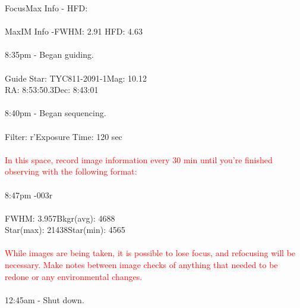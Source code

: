 \documentclass[11pt]{report}
\begin{document}
FocusMax Info - \hspace{72pt}HFD: \\ \\
MaxIM Info -\hspace{90pt}FWHM: 2.91 \hspace{75pt}HFD: 4.63 \\ \\
8:35pm - Began guiding. \\ \\
Guide Star: TYC811-2091-1\hspace{20pt}Mag: 10.12 \\
RA: 8:53:50.3\hspace{90pt}Dec: 8:43:01\\ \\
8:40pm - Began sequencing. \\ \\
Filter: r'\hspace{99pt}Exposure Time: 120 sec\\ \\
\textcolor{red}{In this space, record image information every 30 min until you're finished observing with the following format:} \\ \\ 
8:47pm -\hspace{97pt}003r \\ \\
FWHM: 3.957\hspace{70pt}Bkgr(avg): 4688 \\
Star(max): 21438\hspace{55pt}Star(min): 4565\\ \\
\textcolor{red}{While images are being taken, it is possible to lose focus, and refocusing will be necessary. Make notes between image checks of anything that needed to be redone or any environmental changes.} \\ \\ 
12:45am - Shut down.
\end{document}
